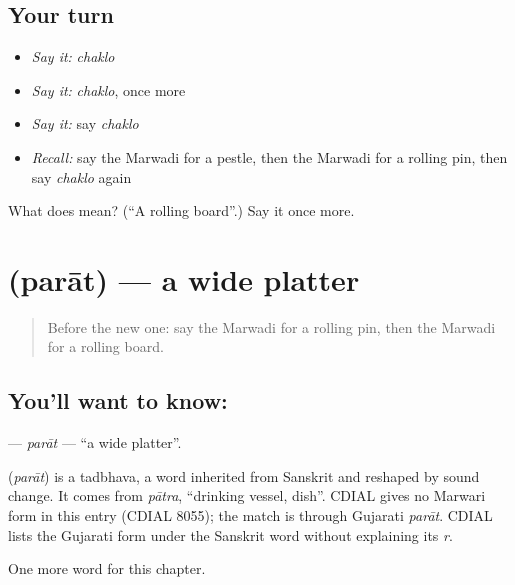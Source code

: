 \subsection*{Your turn}
\begin{itemize}
\raggedright
  \item \emph{Say it:} \emph{chaklo}
  \item \emph{Say it:} \emph{chaklo}, once more
  \item \emph{Say it:} say \emph{chaklo}
  \item \emph{Recall:} say the Marwadi for a pestle, then the Marwadi for a rolling pin, then say \emph{chaklo} again
\end{itemize}

\begin{tcolorbox}[breakable,colback=teal!4,colframe=teal!35!black,title={Before you move on}]
What does  mean? (\textquotedblleft{}A rolling board\textquotedblright{}.) Say it once more.
\end{tcolorbox}
\section[\texorpdfstring{\mw{परात} (parāt)}{परात (parāt)}]{ (parāt) — a wide platter}

\label{lesson:MW-C121-parat}



\begin{quote}
Before the new one: say the Marwadi for a rolling pin, then the Marwadi for a rolling board.
\end{quote}

\subsection*{You'll want to know: }
\textbf{} — \emph{parāt} — \textquotedblleft{}a wide platter\textquotedblright{}.

\begin{cousinweb}
\textbf{} (\emph{parāt}) is a tadbhava, a word inherited from Sanskrit and reshaped by sound change. It comes from \emph{pātra}, \textquotedblleft{}drinking vessel, dish\textquotedblright{}. CDIAL gives no Marwari form in this entry (CDIAL 8055); the match is through Gujarati \emph{parāt}. CDIAL lists the Gujarati form under the Sanskrit word without explaining its \emph{r}.
\end{cousinweb}

\begin{grammarlens}[title={What you've built}]
One more word for this chapter.
\end{grammarlens}

